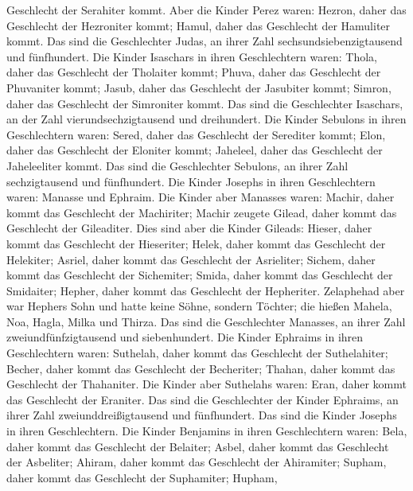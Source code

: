 Geschlecht der Serahiter kommt.  Aber die Kinder Perez
waren: Hezron, daher das Geschlecht der Hezroniter kommt; Hamul, daher
das Geschlecht der Hamuliter kommt.  Das sind die
Geschlechter Judas, an ihrer Zahl sechsundsiebenzigtausend und
fünfhundert.  Die Kinder Isaschars in ihren Geschlechtern
waren: Thola, daher das Geschlecht der Tholaiter kommt; Phuva, daher das
Geschlecht der Phuvaniter kommt;  Jasub, daher das
Geschlecht der Jasubiter kommt; Simron, daher das Geschlecht der
Simroniter kommt.  Das sind die Geschlechter Isaschars, an
der Zahl vierundsechzigtausend und dreihundert.  Die Kinder
Sebulons in ihren Geschlechtern waren: Sered, daher das Geschlecht der
Serediter kommt; Elon, daher das Geschlecht der Eloniter kommt;
Jaheleel, daher das Geschlecht der Jaheleeliter kommt.  Das
sind die Geschlechter Sebulons, an ihrer Zahl sechzigtausend und
fünfhundert.  Die Kinder Josephs in ihren Geschlechtern
waren: Manasse und Ephraim.  Die Kinder aber Manasses
waren: Machir, daher kommt das Geschlecht der Machiriter; Machir zeugete
Gilead, daher kommt das Geschlecht der Gileaditer.  Dies
sind aber die Kinder Gileads: Hieser, daher kommt das Geschlecht der
Hieseriter; Helek, daher kommt das Geschlecht der Helekiter;
 Asriel, daher kommt das Geschlecht der Asrieliter; Sichem,
daher kommt das Geschlecht der Sichemiter;  Smida, daher
kommt das Geschlecht der Smidaiter; Hepher, daher kommt das Geschlecht
der Hepheriter.  Zelaphehad aber war Hephers Sohn und hatte
keine Söhne, sondern Töchter; die hießen Mahela, Noa, Hagla, Milka und
Thirza.  Das sind die Geschlechter Manasses, an ihrer Zahl
zweiundfünfzigtausend und siebenhundert.  Die Kinder
Ephraims in ihren Geschlechtern waren: Suthelah, daher kommt das
Geschlecht der Suthelahiter; Becher, daher kommt das Geschlecht der
Becheriter; Thahan, daher kommt das Geschlecht der Thahaniter.
 Die Kinder aber Suthelahs waren: Eran, daher kommt das
Geschlecht der Eraniter.  Das sind die Geschlechter der
Kinder Ephraims, an ihrer Zahl zweiunddreißigtausend und fünfhundert.
Das sind die Kinder Josephs in ihren Geschlechtern.  Die
Kinder Benjamins in ihren Geschlechtern waren: Bela, daher kommt das
Geschlecht der Belaiter; Asbel, daher kommt das Geschlecht der
Asbeliter; Ahiram, daher kommt das Geschlecht der Ahiramiter;
 Supham, daher kommt das Geschlecht der Suphamiter; Hupham,

